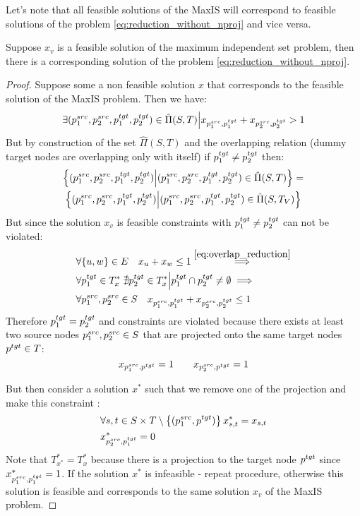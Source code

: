 Let's note that all feasible solutions of the MaxIS will correspond to feasible solutions of the
problem \ref{eq:reduction_without_nproj} and vice versa.

\begin{lemma} \label{lemma:maxis_f_implies_ilp}
    Suppose \( x_v \) is a feasible solution of the maximum independent set problem, then there is a
    corresponding solution of the problem \eqref{eq:reduction_without_nproj}.
\end{lemma}
\begin{proof}
    Suppose some a non feasible solution \( x \) that corresponds to the feasible solution of the
    MaxIS problem. Then we have:
    \[
        \exists (p_1^{src}, p_2^{src}, p_1^{tgt}, p_2^{tgt}) \in \hat{\Pi}(S, T) \Big|
        x_{p_1^{src}, p_1^{tgt}} + x_{p_2^{src}, p_2^{tgt}} > 1
    \]
    But by construction of the set \( \hat{\Pi}(S, T) \) and the overlapping relation (dummy target nodes
    are overlapping only with itself) if \( p_1^{tgt} \neq p_2^{tgt} \) then:
    \begin{multline*}
        \left\{ (p_1^{src}, p_2^{src}, p_1^{tgt}, p_2^{tgt}) \Big| (p_1^{src}, p_2^{src}, p_1^{tgt}, p_2^{tgt}) \in \hat{\Pi}(S, T) \right\} = \\
        \left\{ (p_1^{src}, p_2^{src}, p_1^{tgt}, p_2^{tgt}) \Big| (p_1^{src}, p_2^{src}, p_1^{tgt}, p_2^{tgt}) \in \hat{\Pi}(S, T_V) \right\}
    \end{multline*}
    But since the solution \( x_v \) is feasible constraints with  \( p_1^{tgt} \neq p_2^{tgt} \) can not be violated:
    \begin{align*}
         & \forall \{ u, w \} \in E \quad x_u + x_w \leq 1 \stackrel{\eqref{eq:overlap_reduction}}{\implies}                  \\
         & \forall p_1^{tgt} \in T^*_x \; \nexists p_2^{tgt} \in T^*_x \Big| p_1^{tgt} \cap p_2^{tgt} \neq \emptyset \implies \\
         & \forall p_1^{src}, p_2^{src} \in S \quad x_{p_1^{src}, p_1^{tgt}} + x_{p_2^{src}, p_2^{tgt}} \leq 1
    \end{align*}
    Therefore \( p_1^{tgt} = p_2^{tgt} \) and constraints are violated because there exists
    at least two source nodes \( p_1^{src}, p_2^{src} \in S \) that are projected onto the same target nodes \( p^{tgt} \in T \):
    \[
        x_{p_1^{src}, p^{tgt}} = 1 \qquad x_{p_2^{src}, p^{tgt}} = 1
    \]

    But then consider a solution \( x^* \) such that we remove one of the projection and make this constraint :
    \begin{align*}
         & \forall s,t \in S \times T \setminus \left\{ (p_1^{src}, p^{tgt}) \right\} x^*_{s,t} = x_{s,t} \\
         & x^*_{p_2^{src}, p_1^{tgt}} = 0
    \end{align*}
    Note that \( T^*_{x^*} = T^*_x  \) because there is a projection to the target node \( p^{tgt} \)
    since \( \)  \( x^*_{p_1^{src}, p_1^{tgt}} = 1 \).
    If the solution \( x^* \) is infeasible - repeat procedure, otherwise
    this solution is feasible and corresponds to the same solution \( x_v \) of the MaxIS problem.
\end{proof}

